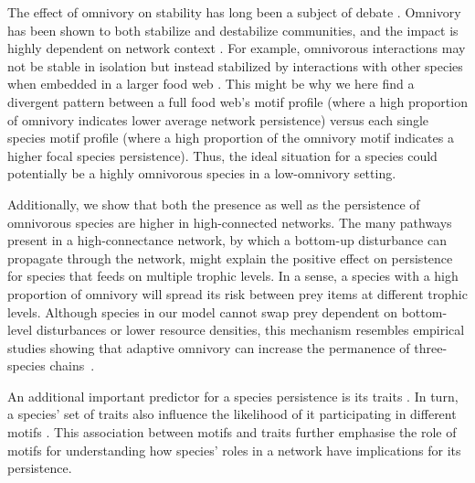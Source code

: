 \documentclass[12pt]{article}
\begin{document}
\begin{spacing}{2.0}
The effect of omnivory on stability has long been a subject of debate \citep{Kratina2012}. 
Omnivory has been shown to both stabilize and destabilize communities, and the impact is highly dependent on network context \citep{bascompte2005simple, Monteiro2016}. 
For example, omnivorous interactions may not be stable in isolation but instead stabilized by interactions with other species when embedded in a larger food web \citep{Kratina2012}. 
This might be why we here find a divergent pattern between a full food web's motif profile (where a high proportion of omnivory indicates lower average network persistence) versus each single species motif profile (where a high proportion of the omnivory motif indicates a higher focal species persistence).
Thus, the ideal situation for a species could potentially be a highly omnivorous species in a low-omnivory setting. 

Additionally, we show that both the presence as well as the persistence of omnivorous species are higher in high-connected networks.
The many pathways present in a high-connectance network, by which a bottom-up disturbance can propagate through the network, might explain the positive effect on persistence for species that feeds on multiple trophic levels.
In a sense, a species with a high proportion of omnivory will spread its risk between prey items at different trophic levels.
Although species in our model cannot swap prey dependent on bottom-level disturbances or lower resource densities, this mechanism resembles empirical studies showing that adaptive omnivory can increase the permanence of three-species chains~\citep{Fagan1997, Kvrivan2005, AbramsFung2010}.

An additional important predictor for a species persistence is its traits \citep{Brose2017, curtsdotter2011robustness, Cardillo2005, Purvis2000}. In turn, a species' set of traits also influence the likelihood of it participating in different motifs \citep{cirtwill2018feeding}. This association between motifs and traits further emphasise the role of motifs for understanding how species' roles in a network have implications for its persistence. 


\end{spacing}
\end{document}
